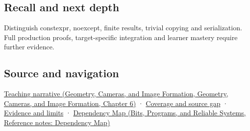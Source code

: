 \subsection{Recall and next depth}\label{appendix-37a39984ba66-recall-and-next-depth}

Distinguish constexpr, noexcept, finite results, trivial copying and serialization. Full production proofs, target-specific integration and learner mastery require further evidence.

\subsection{Source and navigation}\label{appendix-37a39984ba66-source-and-navigation}

\href{../03-Geometry-Cameras-and-Image-Formation/main.pdf\#nameddest=02-foundations-ii-ch037-three-stored-numbers-are-not-the-complete-contract}{Teaching narrative (Geometry, Cameras, and Image Formation, Geometry, Cameras, and Image Formation, Chapter 6)} · \hyperref[appendix-fd090d982a15-phase-6---parts-501-600]{Coverage and source gap} · \hyperref[appendix-a103e7846d21-phase-6---source-analysis-and-verification]{Evidence and limits} · \href{../01-Bits-Programs-and-Reliable-Systems/main.pdf\#nameddest=appendix-4ad47bdd269a}{Dependency Map (Bits, Programs, and Reliable Systems, Reference notes: Dependency Map)}
